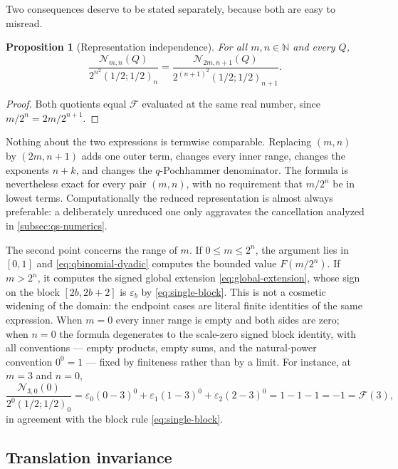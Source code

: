 \documentclass[11pt,oneside]{article}
\newtheorem{proposition}[theorem]{Proposition}
\theoremstyle{definition}
\theoremstyle{remark}
\newcommand{\N}{\mathbb N}
\begin{document}
Two consequences deserve to be stated separately, because both are easy to misread.

\begin{proposition}[Representation independence]
\label{prop:qs-representation}
For all $m,n\in\N$ and every $Q$,
\begin{equation*}
 \frac{\mathcal N_{m,n}(Q)}{2^{n^2}(1/2;1/2)_n}
 =\frac{\mathcal N_{2m,n+1}(Q)}{2^{(n+1)^2}(1/2;1/2)_{n+1}}.
\end{equation*}
\end{proposition}

\begin{proof}
Both quotients equal $\mathcal F$ evaluated at the same real number, since
$m/2^n=2m/2^{n+1}$.
\end{proof}

Nothing about the two expressions is termwise comparable.  Replacing $(m,n)$ by $(2m,n+1)$
adds one outer term, changes every inner range, changes the exponents $n+k$, and changes the
$q$-Pochhammer denominator.  The formula is nevertheless exact for every pair $(m,n)$, with
no requirement that $m/2^n$ be in lowest terms.  Computationally the reduced representation
is almost always preferable: a deliberately unreduced one only aggravates the cancellation
analyzed in \cref{subsec:qs-numerics}.

The second point concerns the range of $m$.  If $0\le m\le2^n$, the argument lies in $[0,1]$
and \eqref{eq:qbinomial-dyadic} computes the bounded value $F(m/2^n)$.  If $m>2^n$, it
computes the signed global extension \eqref{eq:global-extension}, whose sign on the block
$[2b,2b+2]$ is $\varepsilon_b$ by \eqref{eq:single-block}.  This is not a cosmetic widening of
the domain: the endpoint cases are literal finite identities of the same expression.  When
$m=0$ every inner range is empty and both sides are zero; when $n=0$ the formula degenerates
to the scale-zero signed block identity, with all conventions --- empty products, empty sums,
and the natural-power convention $0^0=1$ --- fixed by finiteness rather than by a limit.  For
instance, at $m=3$ and $n=0$,
\begin{equation*}
 \frac{\mathcal N_{3,0}(0)}{2^{0}(1/2;1/2)_0}
 =\varepsilon_0(0-3)^0+\varepsilon_1(1-3)^0+\varepsilon_2(2-3)^0
 =1-1-1=-1=\mathcal F(3),
\end{equation*}
in agreement with the block rule \eqref{eq:single-block}.

\subsection{Translation invariance}
\label{subsec:qs-translation}
\end{document}
